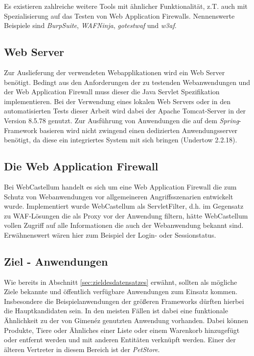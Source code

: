 Es existieren zahlreiche weitere Tools mit ähnlicher Funktionalität, z.T. auch mit Spezialisierung auf das Testen von Web Application Firewalls. Nennenswerte Beispiele sind \emph{BurpSuite}, \emph{WAFNinja}, \emph{gotestwaf} und \emph{w3af}.  

\subsection{Web Server}

Zur Auslieferung der verwendeten Webapplikationen wird ein Web Server benötigt. Bedingt aus den Anforderungen der zu testenden Webanwendungen und der Web Application Firewall muss dieser die Java Servlet Spezifikation implementieren. Bei der Verwendung eines lokalen Web Servers oder in den automatisierten Tests dieser Arbeit wird dabei der Apache Tomcat-Server in der Version 8.5.78 genutzt. Zur Ausführung von Anwendungen die auf dem \emph{Spring}-Framework basieren wird nicht zwingend einen dedizierten Anwendungsserver benötigt, da diese ein integriertes System mit sich bringen (Undertow 2.2.18).

\subsection{Die Web Application Firewall}
Bei WebCastellum handelt es sich um eine Web Application Firewall die zum Schutz von Webanwendungen vor allgemeineren Angriffsszenarien entwickelt wurde. Implementiert wurde WebCastellum als ServletFilter, d.h. im Gegensatz zu WAF-Lösungen die als Proxy vor der Anwendung filtern, hätte WebCastellum vollen Zugriff auf alle Informationen die auch der Webanwendung bekannt sind. Erwähnenswert wären hier zum Beispiel der Login- oder Sessionstatus. 


\subsection{Ziel - Anwendungen}

Wie bereits in Abschnitt \ref{sec:zieldesdatensatzes} erwähnt, sollten als mögliche Ziele bekannte und öffentlich verfügbare Anwendungen zum Einsatz kommen. Insbesondere die Beispielanwendungen der größeren Frameworks dürften hierbei die Hauptkandidaten sein. In den meisten Fällen ist dabei eine funktionale Ähnlichkeit zu der von Gimenéz genutzten Anwendung vorhanden. Dabei können Produkte, Tiere oder Ähnliches einer Liste oder einem Warenkorb hinzugefügt oder entfernt werden und mit anderen Entitäten verknüpft werden. Einer der älteren Vertreter in diesem Bereich ist der \emph{PetStore}.

